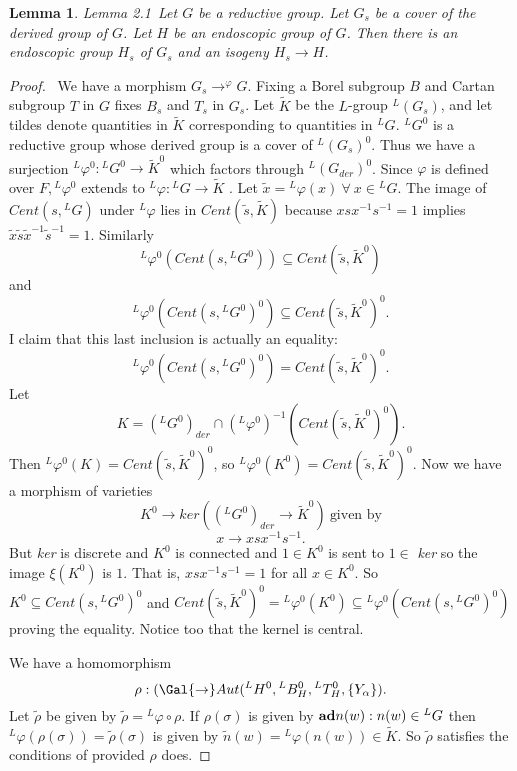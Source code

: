\documentclass{memo-l}
\newtheorem{lemma}[theorem]{Lemma}
\theoremstyle{definition}
\theoremstyle{remark}
\numberwithin{section}{chapter}
\numberwithin{equation}{chapter}
\begin{document}
\begin{lemma}{Lemma 2.1}\ Let $G$ be a reductive group.  Let $G_{s}$ be a
cover of the derived group of $G$.  Let $H$ be an endoscopic group of $G$.
Then there is an endoscopic group $H_{s}$ of $G_{s}$ and an isogeny  $H_{s}
{\to} H$.
\end{lemma}

\begin{proof} \ We have a morphism $G_{s} {\to}^{\varphi} G$.  Fixing
a Borel subgroup $B$ and Cartan subgroup $T$ in $G$ fixes $B_{s}$ and
$T_{s}$ in $G_{s}$.  Let $\tilde K $ be the $L$-group ${}^{L}(G_{s})$, and
let tildes denote quantities in $\tilde K $ corresponding to quantities in
${}^{L}G$.  ${}^{L}G^{0}$ is a reductive group whose derived group is a cover
of ${}^{L}(G_{s})^{0}$.  Thus we have a surjection
${}^{L}{\varphi}^{0}:{}^{L}G^{0} {\to} \tilde K ^{0}$ which factors through
${}^{L}(G_{der})^{0}$.  Since ${\varphi}$ is defined over
$F, {}^{L}{\varphi}^{0}$ extends to ${}^{L}{\varphi}: {}^{L}G {\to} \tilde K$
\cite{MR546608}.  Let $\tilde x  =  {}^{L}{\varphi}(x) {\ \forall\ } x  \in
{}^{L}G$.  The image of $Cent(s,{}^{L}G)$ under ${}^{L}{\varphi}$ lies in
$Cent(\tilde s ,\tilde K )$ because $xsx^{-1}s^{-1}  = 1$ implies $\tilde x
\tilde s \tilde x ^{-1}\tilde s ^{-1}  = 1$.  Similarly
$${}^{L}{\varphi}^{0}(Cent(s,{}^{L}G^{0})) {\subseteq} Cent(\tilde s ,\tilde K
^{0})$$ and $${}^{L}{\varphi}^{0}(Cent(s,{}^{L}G^{0})^{0}) {\subseteq}
Cent(\tilde s ,\tilde K^{0})^{0}.$$ I claim that this last inclusion is
actually an equality: $${}^{L}{\varphi}^{0}(Cent(s,{}^{L}G^{0})^{0})  =
Cent(\tilde s ,\tilde K^{0})^{0}.$$  Let $$K  =  ({}^{L}G^{0})_{der} {\cap}
({}^{L}{\varphi}^{0})^{-1}(Cent(\tilde s ,\tilde K^{0})^{0}).$$  Then
${}^{L}{\varphi}^{0}(K)  =  Cent(\tilde s ,\tilde K^{0})^{0}$, so
${}^{L}{\varphi}^{0}(K^{0})  =  Cent(\tilde s ,\tilde K^{0})^{0}$.  Now we
have a morphism of varieties
$$
K^{0} {\to} ker(({}^{L}G^{0})_{der} {\to} \tilde{K}^{0})\ {\text{given\ by}}
$$
$$
x {\to} xsx^{-1}s^{-1}.
$$
But {\it ker} is discrete and $K^{0}$ is connected and $1  \in  K^{0}$ is
sent to $1  \in $ {\it ker} so the image $\xi (K^{0})$ is $1$.  That is,
$xsx^{-1}s^{-1} = 1$ for all $x  \in  K^{0}$.  So $K^{0} {\subseteq}
Cent(s,{}^{L}G^{0})^{0}$ and $Cent(\tilde s ,\tilde{K}^{0})^{0}  =
{}^{L}{\varphi}^{0}(K^{0}) {\subseteq}
{}^{L}{\varphi}^{0}(Cent(s,{}^{L}G^{0})^{0})$ proving the equality.  Notice too
that the kernel is central.

   We have a homomorphism
$$
{\rho }:(\Gal {\to}
Aut({}^{L}H^{0},{}^{L}B_{H}^{0},{}^{L}T_{H}^{0},\{Y_{{\alpha}}\}).
$$
Let $\tilde {\rho }$ be given by $\tilde {\rho }  =  {}^{L}{\varphi\circ\rho }$.
If ${\rho }({\sigma})$ is given by ${\bold {ad}}n(w) : n(w)  \in  {}^{L}G$ then
${}^{L}{\varphi}({\rho }({\sigma}))  =  \tilde {\rho } ({\sigma})$ is given by
$\tilde n (w)  =  {}^{L}{\varphi}(n(w))  \in  \tilde K .$ So $\tilde {\rho } $
satisfies the conditions of \cite{MR697567} provided ${\rho }$ does.


\end{proof}
\end{document}
